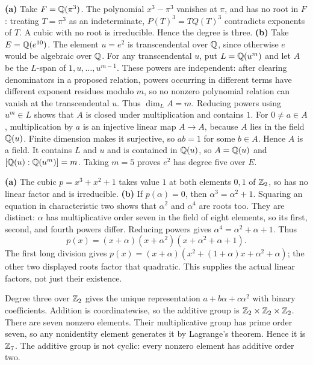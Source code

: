 \textbf{(a)} Take $F=\mathbb{Q}(\pi^3)$. The polynomial $x^3-\pi^3$ vanishes at $\pi$, and has no root in $F$: treating $T=\pi^3$ as an indeterminate, $P(T)^3=TQ(T)^3$ contradicts exponents of $T$. A cubic with no root is irreducible. Hence the degree is three.
\textbf{(b)} Take $E=\mathbb{Q}(e^{10})$. The element $u=e^2$ is transcendental over $\mathbb{Q}$, since otherwise $e$ would be algebraic over $\mathbb{Q}$. For any transcendental $u$, put $L=\mathbb{Q}(u^m)$ and let $A$ be the $L$-span of $1,u,\ldots,u^{m-1}$. These powers are independent: after clearing denominators in a proposed relation, powers occurring in different terms have different exponent residues modulo $m$, so no nonzero polynomial relation can vanish at the transcendental $u$. Thus $\dim_L A=m$. Reducing powers using $u^m\in L$ shows that $A$ is closed under multiplication and contains $1$. For $0\ne a\in A$, multiplication by $a$ is an injective linear map $A\to A$, because $A$ lies in the field $\mathbb{Q}(u)$. Finite dimension makes it surjective, so $ab=1$ for some $b\in A$. Hence $A$ is a field. It contains $L$ and $u$ and is contained in $\mathbb{Q}(u)$, so $A=\mathbb{Q}(u)$ and $[\mathbb{Q}(u):\mathbb{Q}(u^m)]=m$. Taking $m=5$ proves $e^2$ has degree five over $E$.

\textbf{(a)} The cubic $p=x^3+x^2+1$ takes value $1$ at both elements $0,1$ of $\mathbb{Z}_2$, so has no linear factor and is irreducible.
\textbf{(b)} If $p(\alpha)=0$, then $\alpha^3=\alpha^2+1$. Squaring an equation in characteristic two shows that $\alpha^2$ and $\alpha^4$ are roots too. They are distinct: $\alpha$ has multiplicative order seven in the field of eight elements, so its first, second, and fourth powers differ. Reducing powers gives $\alpha^4=\alpha^2+\alpha+1$. Thus
\[p(x)=(x+\alpha)(x+\alpha^2)(x+\alpha^2+\alpha+1).\]
The first long division gives $p(x)=(x+\alpha)(x^2+(1+\alpha)x+\alpha^2+\alpha)$; the other two displayed roots factor that quadratic. This supplies the actual linear factors, not just their existence.

Degree three over $\mathbb{Z}_2$ gives the unique representation $a+b\alpha+c\alpha^2$ with binary coefficients. Addition is coordinatewise, so the additive group is $\mathbb{Z}_2\times\mathbb{Z}_2\times\mathbb{Z}_2$.
There are seven nonzero elements. Their multiplicative group has prime order seven, so any nonidentity element generates it by Lagrange's theorem. Hence it is $\mathbb{Z}_7$. The additive group is not cyclic: every nonzero element has additive order two.

